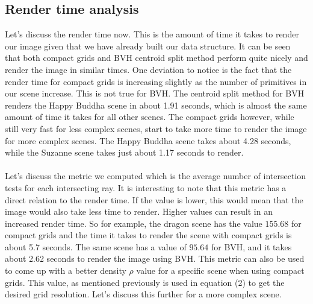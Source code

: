 \documentclass[11pt,a4paper]{article}
\begin{document}
\subsection{Render time analysis}
Let's discuss the render time now. This is the amount of time it takes to render our image given that we have already built our data structure. It can be seen that both compact grids and BVH centroid split method perform quite nicely and render the image in similar times. One deviation to notice is the fact that the render time for compact grids is increasing slightly as the number of primitives in our scene increase. This is not true for BVH. The centroid split method for BVH renders the Happy Buddha scene in about 1.91 seconds, which is almost the same amount of time it takes for all other scenes. The compact grids however, while still very fast for less complex scenes, start to take more time to render the image for more complex scenes. The Happy Buddha scene takes about 4.28 seconds, while the Suzanne scene takes just about 1.17 seconds to render.
\\~\\
Let's discuss the metric we computed which is the average number of intersection tests for each intersecting ray. It is interesting to note that this metric has a direct relation to the render time. If the value is lower, this would mean that the image would also take less time to render. Higher values can result in an increased render time. So for example, the dragon scene has the value $155.68$ for compact grids and the time it takes to render the scene with compact grids is about 5.7 seconds. The same scene has a value of $95.64$ for BVH, and it takes about 2.62 seconds to render the image using BVH. This metric can also be used to come up with a better density $\rho$ value for a specific scene when using compact grids. This value, as mentioned previously is used in equation (2) to get the desired grid resolution. Let's discuss this further for a more complex scene.
\end{document}
